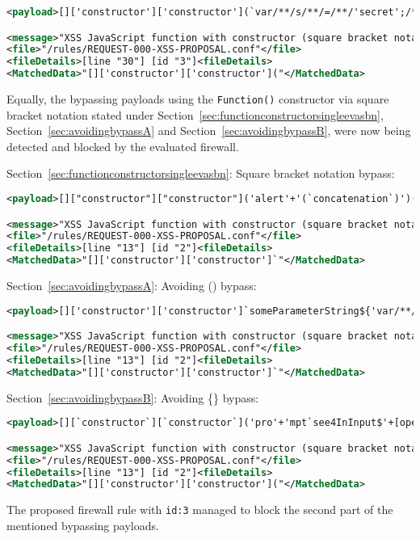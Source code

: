 \begin{lstlisting}[style=ruleStyle, language=XML, caption=Function() constructor bypass in square bracket notation blocked, label={lst:constructorsblockedsbn}]
<payload>[]['constructor']['constructor'](`var/**/s/**/=/**/'secret';/**/promp`/**/+/**/`t(s,/**/s)`)()</payload>

<message>"XSS JavaScript function with constructor (square bracket notation)"</message>
<file>"/rules/REQUEST-000-XSS-PROPOSAL.conf"</file>
<fileDetails>[line "30"] [id "3"]<fileDetails>
<MatchedData>"[]['constructor']['constructor']("</MatchedData>
\end{lstlisting}
Equally, the bypassing payloads using the \verb|Function()| constructor via square bracket notation stated under Section~\ref{sec:functionconstructorsingleevasbn}, Section~\ref{sec:avoidingbypassA} and Section~\ref{sec:avoidingbypassB}, were now being detected and blocked by the evaluated firewall. 

Section~\ref{sec:functionconstructorsingleevasbn}: Square bracket notation bypass:

\begin{lstlisting}[style=ruleStyle, language=XML, caption=Square bracket notation bypass blocked]
<payload>[]["constructor"]["constructor"]('alert'+'(`concatenation`)')()</payload>

<message>"XSS JavaScript function with constructor (square bracket notation)"</message>
<file>"/rules/REQUEST-000-XSS-PROPOSAL.conf"</file>
<fileDetails>[line "13"] [id "2"]<fileDetails>
<MatchedData>"[]['constructor']['constructor']`"</MatchedData>
\end{lstlisting}
Section~\ref{sec:avoidingbypassA}: Avoiding () bypass:

\begin{lstlisting}[style=ruleStyle, language=XML, caption={Avoiding () bypass blocked}]
<payload>[]['constructor']['constructor']`someParameterString${'var/**/s/**/=/**/"secret";promp'+'t`s\\u{0024}{s}`'}```</payload>

<message>"XSS JavaScript function with constructor (square bracket notation)"</message>
<file>"/rules/REQUEST-000-XSS-PROPOSAL.conf"</file>
<fileDetails>[line "13"] [id "2"]<fileDetails>
<MatchedData>"[]['constructor']['constructor']`"</MatchedData>
\end{lstlisting}
Section~\ref{sec:avoidingbypassB}: Avoiding \{\} bypass:

\begin{lstlisting}[style=ruleStyle, language=XML, caption={Avoiding \{\} bypass blocked}]
<payload>[][`constructor`][`constructor`]('pro'+'mpt`see4InInput$'+[open+[]][0][16]+'2+2'+[open+[]][0][36]+':`')()</payload>

<message>"XSS JavaScript function with constructor (square bracket notation)"</message>
<file>"/rules/REQUEST-000-XSS-PROPOSAL.conf"</file>
<fileDetails>[line "13"] [id "2"]<fileDetails>
<MatchedData>"[]['constructor']['constructor']("</MatchedData>
\end{lstlisting}
The proposed firewall rule with \verb|id:3| managed to block the second part of the mentioned bypassing payloads.

